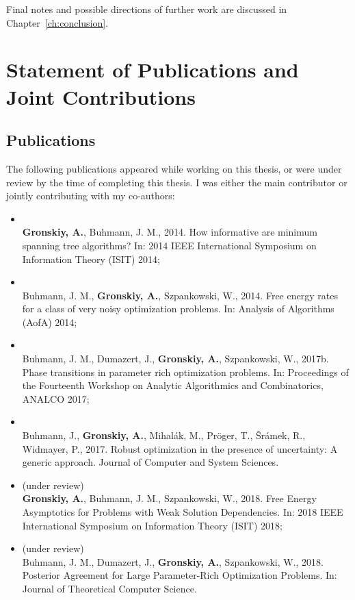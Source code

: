 Final notes and possible directions of further work are discussed in
Chapter~\ref{ch:conclusion}.

\section{Statement of Publications and Joint Contributions}

\subsection*{Publications}

The following publications appeared while working on this thesis, or were under
review by the time of completing this thesis. I was either the main contributor
or jointly contributing with my co-authors:
\begin{itemize}
    \item \citep{gronskiy14} \\
    \textbf{Gronskiy, A.}, Buhmann, J. M., 2014. How informative are minimum
    spanning tree algorithms? In: 2014 IEEE International Symposium on
    Information Theory (ISIT) 2014;

    \item \citep{aofa2014} \\
    Buhmann, J. M., \textbf{Gronskiy, A.}, Szpankowski, W., 2014. Free energy rates
    for a class of very noisy optimization problems. In: Analysis of Algorithms
    (AofA) 2014;

    \item \citep{analco17} \\
    Buhmann, J. M., Dumazert, J., \textbf{Gronskiy, A.}, Szpankowski, W., 2017b. Phase
    transitions in parameter rich optimization problems. In: Proceedings of
    the Fourteenth Workshop on Analytic Algorithmics and Combinatorics, ANALCO
    2017;

    \item \citep{jcss:2017} \\
    Buhmann, J., \textbf{Gronskiy, A.}, Mihal\'ak, M., Pr\"oger, T.,
    \v{S}r\'amek, R., Widmayer, P., 2017. Robust optimization in the presence of
    uncertainty: A generic approach. Journal of Computer and System Sciences.

    \item (under review) \\
    \textbf{Gronskiy, A.}, Buhmann, J. M., Szpankowski, W., 2018. Free Energy Asymptotics
    for Problems with Weak Solution Dependencies. In: 2018 IEEE International
    Symposium on Information Theory (ISIT) 2018;

    \item (under review) \\
    Buhmann, J. M., Dumazert, J., \textbf{Gronskiy, A.}, Szpankowski, W., 2018.
    Posterior Agreement for Large Parameter-Rich Optimization Problems. In:
    Journal of Theoretical Computer Science.
\end{itemize}

